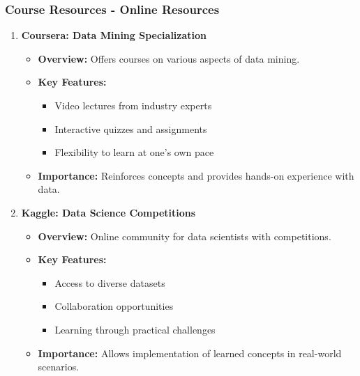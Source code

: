\documentclass[aspectratio=169]{beamer}
\begin{document}
\begin{frame}[fragile]
    \frametitle{Course Resources - Online Resources}
    \begin{enumerate}
        \item \textbf{Coursera: Data Mining Specialization}
            \begin{itemize}
                \item \textbf{Overview:} Offers courses on various aspects of data mining.
                \item \textbf{Key Features:}
                    \begin{itemize}
                        \item Video lectures from industry experts
                        \item Interactive quizzes and assignments
                        \item Flexibility to learn at one’s own pace
                    \end{itemize}
                \item \textbf{Importance:} Reinforces concepts and provides hands-on experience with data.
            \end{itemize}

        \item \textbf{Kaggle: Data Science Competitions}
            \begin{itemize}
                \item \textbf{Overview:} Online community for data scientists with competitions.
                \item \textbf{Key Features:}
                    \begin{itemize}
                        \item Access to diverse datasets
                        \item Collaboration opportunities
                        \item Learning through practical challenges
                    \end{itemize}
                \item \textbf{Importance:} Allows implementation of learned concepts in real-world scenarios.
            \end{itemize}
    \end{enumerate}
\end{frame}
\end{document}
